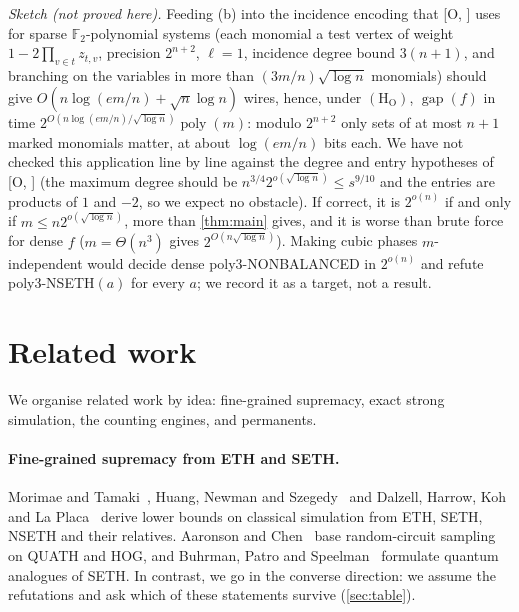 \documentclass[10pt]{amsart}
\theoremstyle{plain}
\theoremstyle{definition}
\theoremstyle{remark}
\numberwithin{equation}{section}
\newcommand{\poly}{\operatorname{poly}}
\newcommand{\gap}{\operatorname{gap}}
\newcommand{\Oa}[1][]{\textup{[O\if\relax\detokenize{#1}\relax\else, #1\fi]}}
\begin{document}
\emph{Sketch (not proved here).} Feeding (b) into the incidence encoding that \Oa{} uses for sparse
$\mathbb F_2$-polynomial systems (each monomial a test vertex of weight $1-2\prod_{v\in t}z_{t,v}$,
precision $2^{n+2}$, $\ell=1$, incidence degree bound $3(n+1)$, and branching on the variables in
more than $(3m/n)\sqrt{\log n}$ monomials) should give $O(n\log(em/n)+\sqrt n\log n)$ wires, hence,
under $(\mathrm{H}_{\mathrm{O}})$, $\gap(f)$ in time $2^{O(n\log(em/n)/\sqrt{\log n})}\poly(m)$:
modulo $2^{n+2}$ only sets of at most $n+1$ marked monomials matter, at about $\log(em/n)$ bits
each. We have not checked this application line by line against the
degree and entry hypotheses of \Oa{} (the maximum degree should be $n^{3/4}2^{o(\sqrt{\log n})}\le s^{9/10}$
and the entries are products of $1$ and $-2$, so we expect no obstacle). If correct, it is $2^{o(n)}$ if and
only if $m\le n2^{o(\sqrt{\log n})}$, more than \cref{thm:main} gives, and it is worse than brute
force for dense $f$ ($m=\Theta(n^3)$ gives $2^{O(n\sqrt{\log n})}$). Making cubic phases
$m$-independent would decide dense poly3-NONBALANCED in $2^{o(n)}$ and refute poly3-NSETH$(a)$
for every $a$; we record it as a target, not a result.

\section{Related work}\label{sec:related}

We organise related work by idea: fine-grained supremacy, exact strong simulation, the counting
engines, and permanents.

\paragraph{Fine-grained supremacy from ETH and SETH\@.} Morimae and Tamaki~\cite{MT19a,MT19b,MT20},
Huang, Newman and Szegedy~\cite{HNS18,HNS19} and Dalzell, Harrow, Koh and La Placa~\cite{DHKL20}
derive lower bounds on classical simulation from ETH, SETH, NSETH and their relatives. Aaronson and
Chen~\cite{AC17} base random-circuit sampling on QUATH and HOG, and Buhrman, Patro and
Speelman~\cite{BPS19} formulate quantum analogues of SETH. In contrast, we go in the converse
direction: we assume the refutations and ask which of these statements survive (\cref{sec:table}).
\end{document}
